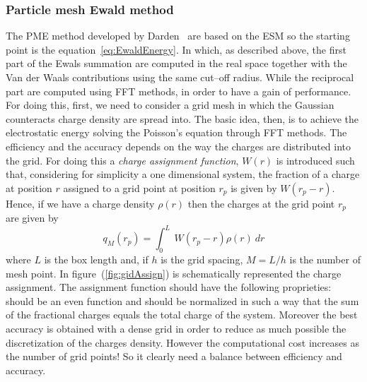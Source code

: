 \subsubsection{Particle mesh Ewald method}
The \acf{PME} method developed by Darden \etal\, \cite{DardenPME} are based on the \ac{ESM} so the starting point is the equation~\eqref{eq:EwaldEnergy}. In which, as described above, the first part of the Ewals summation are computed in the real space together with the Van der Waals contributions using the same cut--off radius. While the reciprocal part are computed using \ac{FFT} methods, in order to have a gain of performance. For doing this, first, we need to consider a grid mesh in which the Gaussian counteracts charge density are spread into. The basic idea, then, is to achieve the electrostatic energy solving the Poisson's equation through \ac{FFT} methods. The efficiency and the accuracy depends on the way the charges are distributed into the grid. For doing this a \textit{charge assignment function}, $W(r)$ is introduced such that, considering for simplicity a one dimensional system, the fraction of a charge at position $r$ assigned to a grid point at position $r_p$ is given by $W(r_p - r)$. Hence, if we have a charge density $\rho(r)$ then the charges at the grid point $r_p$ are given by
\begin{equation}
	q_M(r_p) = \int_0^L\ W(r_p - r) \rho (r)\ dr
	\label{eq:meshAssign}
\end{equation}
where $L$ is the box length and, if $h$ is the grid spacing, $M = L/h$ is the number of mesh point. In figure~(\ref{fig:gidAssign}) is schematically represented the charge assignment. The assignment function should have the following proprieties: should be an even function and should be normalized in such a way that the sum of the fractional charges equals the total charge of the system. Moreover the best accuracy is obtained with a dense grid in order to reduce as much possible the discretization of the charges density. However the computational cost increases as the number of grid points! So it clearly need a balance between efficiency and accuracy.
